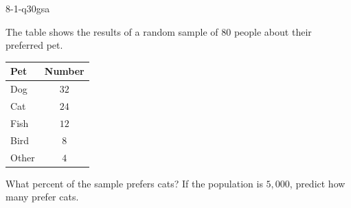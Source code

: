 \begin{practiceQuestion}{8-1-q30}{gsa}
\begin{questionText}
The table shows the results of a random sample of $80$ people about their preferred pet.

\begin{center}
\begin{tabular}{|l|c|}
\hline
\textbf{Pet} & \textbf{Number} \\
\hline
Dog & $32$ \\
\hline
Cat & $24$ \\
\hline
Fish & $12$ \\
\hline
Bird & $8$ \\
\hline
Other & $4$ \\
\hline
\end{tabular}
\end{center}

What percent of the sample prefers cats? If the population is $5{,}000$, predict how many prefer cats.
\end{questionText}
\end{practiceQuestion}
